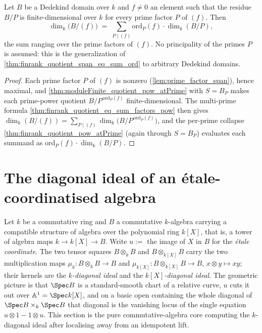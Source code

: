 \begin{theorem}
  \label{thm:finrank_quotient_span_eq_sum_count}
  \leanok
  Let \(B\) be a Dedekind domain over \(k\) and \(f \neq 0\) an element such that the
  residue \(B/P\) is finite-dimensional over \(k\) for every prime factor \(P\) of
  \((f)\). Then
  \[
    \dim_k\bigl(B/(f)\bigr) \;=\;
      \sum_{P \mid (f)} \mathrm{ord}_P(f) \cdot \dim_k(B/P) ,
  \]
  the sum ranging over the prime factors of \((f)\). No principality of the primes
  \(P\) is assumed: this is the generalization of
  \ref{thm:finrank_quotient_span_eq_sum_ord} to arbitrary Dedekind domains.
\end{theorem}
\begin{proof}
  \leanok
  Each prime factor \(P\) of \((f)\) is nonzero (\ref{lem:prime_factor_span}), hence
  maximal, and \ref{thm:moduleFinite_quotient_pow_atPrime} with \(S = B_P\) makes each
  prime-power quotient \(B/P^{\,\mathrm{ord}_P(f)}\) finite-dimensional. The
  multi-prime formula \ref{thm:finrank_quotient_eq_sum_factors_pow} then gives
  \(\dim_k(B/(f)) = \sum_{P \mid (f)} \dim_k\bigl(B/P^{\,\mathrm{ord}_P(f)}\bigr)\),
  and the per-prime collapse \ref{thm:finrank_quotient_pow_atPrime} (again through
  \(S = B_P\)) evaluates each summand as
  \(\mathrm{ord}_P(f) \cdot \dim_k(B/P)\).
\end{proof}

\section{The diagonal ideal of an \'etale-coordinatised algebra}
\label{sec:diagonal_ideal}

Let \(k\) be a commutative ring and \(B\) a commutative \(k\)-algebra carrying a compatible
structure of algebra over the polynomial ring \(k[X]\), that is, a tower of algebra maps
\(k \to k[X] \to B\). Write \(u := \) the image of \(X\) in \(B\) for the \emph{\'etale
coordinate}. The two tensor squares \(B \otimes_k B\) and \(B \otimes_{k[X]} B\) carry the two
multiplication maps \(\mu_k \colon B \otimes_k B \to B\) and \(\mu_{k[X]} \colon B
\otimes_{k[X]} B \to B\), \(x \otimes y \mapsto xy\); their kernels are the \emph{\(k\)-diagonal
ideal} and the \emph{\(k[X]\)-diagonal ideal}. The geometric picture is that \(\Spec B\) is a
standard-smooth chart of a relative curve, \(u\) cuts it out over \(\mathbb A^1 = \Spec k[X]\),
and on a basic open containing the whole diagonal of \(\Spec B \times_k \Spec B\) that diagonal
is the vanishing locus of the single equation \(u \otimes 1 - 1 \otimes u\). This section is the
pure commutative-algebra core computing the \(k\)-diagonal ideal after localising away from an
idempotent lift.

